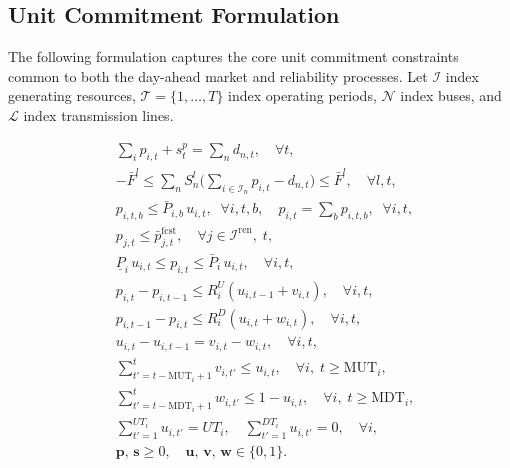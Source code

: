 \documentclass[journal]{IEEEtran}
\begin{document}
\subsection{Unit Commitment Formulation}


The following formulation captures the core unit commitment
constraints common to both the day-ahead market and reliability
processes. Let $\mathcal{I}$ index generating resources,
$\mathcal{T} = \{1,\dots,T\}$ index operating periods,
$\mathcal{N}$ index buses, and $\mathcal{L}$ index transmission
lines.

\begin{subequations}\label{eq:uc_base}
\begin{align}
&\sum_{i} p_{i,t} + s_t^{p} = \sum_n d_{n,t},
  \quad \forall t, \label{eq:uc_bal} \\
&-\bar{F}^l \leq \sum_n S_n^l
  \Big(\sum_{i\in\mathcal{I}_n} p_{i,t} - d_{n,t}\Big)
  \leq \bar{F}^l,
  \quad \forall l,t, \label{eq:uc_flow} \\
&p_{i,t,b} \leq \bar{P}_{i,b}\, u_{i,t},
  \;\; \forall i,t,b, \quad
  p_{i,t} = \textstyle\sum_b p_{i,t,b},
  \;\; \forall i,t, \label{eq:uc_block} \\
&p_{j,t} \leq \bar{p}^{\text{fcst}}_{j,t},
  \quad \forall j \in \mathcal{I}^{\text{ren}},\; t, \label{eq:uc_ren} \\
&\underline{P}_i\, u_{i,t} \leq p_{i,t}
  \leq \bar{P}_i\, u_{i,t},
  \quad \forall i,t, \label{eq:uc_cap} \\
&p_{i,t} - p_{i,t-1} \leq R_i^U (u_{i,t-1} + v_{i,t}),
  \quad \forall i,t, \label{eq:uc_ru} \\
&p_{i,t-1} - p_{i,t} \leq R_i^D (u_{i,t} + w_{i,t}),
  \quad \forall i,t, \label{eq:uc_rd} \\
&u_{i,t} - u_{i,t-1} = v_{i,t} - w_{i,t},
  \quad \forall i,t, \label{eq:uc_logic} \\
&\sum_{t'=t-\text{MUT}_i+1}^{t} v_{i,t'} \leq u_{i,t},
  \quad \forall i,\; t \geq \text{MUT}_i, \label{eq:uc_mut} \\
&\sum_{t'=t-\text{MDT}_i+1}^{t} w_{i,t'} \leq 1 - u_{i,t},
  \quad \forall i,\; t \geq \text{MDT}_i, \label{eq:uc_mdt} \\
&\sum_{t'=1}^{UT_i} u_{i,t'} = UT_i, \quad
  \sum_{t'=1}^{DT_i} u_{i,t'} = 0,
  \quad \forall i, \label{eq:uc_init} \\
&\mathbf{p},\, \mathbf{s} \geq 0, \quad
  \mathbf{u},\, \mathbf{v},\, \mathbf{w} \in \{0,1\}.
  \label{eq:uc_domain}
\end{align}
\end{subequations}
\end{document}
